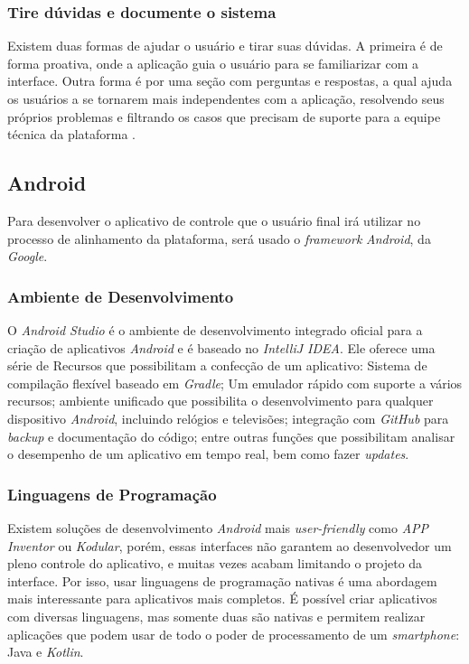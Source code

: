 \subsubsection{Tire dúvidas e documente o sistema}

Existem duas formas de ajudar o usuário e tirar suas dúvidas. A primeira é de forma proativa, onde a aplicação guia o usuário para se familiarizar com a interface. Outra forma é por uma seção com perguntas e respostas, a qual ajuda os usuários a se tornarem mais independentes com a aplicação, resolvendo seus próprios problemas e filtrando os casos que precisam de suporte para a equipe técnica da plataforma \cite{site:nielsenHelpandDoc}.

\subsection{Android}
Para desenvolver o aplicativo de controle que o usuário final irá utilizar no processo de alinhamento da plataforma, será usado o \textit{framework} \textit{Android}, da \textit{Google}.

\subsubsection{Ambiente de Desenvolvimento}

O \textit{Android Studio} é o ambiente de desenvolvimento integrado oficial para a criação de aplicativos \textit{Android} e é baseado no \textit{IntelliJ IDEA}. Ele oferece uma série de Recursos que possibilitam a confecção de um aplicativo: Sistema de compilação flexível baseado em \textit{Gradle}; Um emulador rápido com suporte a vários recursos; ambiente unificado que possibilita o desenvolvimento para qualquer dispositivo \textit{Android}, incluindo relógios e televisões; integração com \textit{GitHub} para \textit{backup} e documentação do código; entre outras funções que possibilitam analisar o desempenho de um aplicativo em tempo real, bem como fazer \textit{updates}. \cite{site:androidstudio}

\subsubsection{Linguagens de Programação}

Existem soluções de desenvolvimento \textit{Android} mais \textit{user-friendly} como \textit{APP Inventor} ou \textit{Kodular}, porém, essas interfaces não garantem ao desenvolvedor um pleno controle do aplicativo, e muitas vezes acabam limitando o projeto da interface. Por isso, usar linguagens de programação nativas é uma abordagem mais interessante para aplicativos mais completos. É possível criar aplicativos com diversas linguagens, mas somente duas são nativas e permitem realizar aplicações que podem usar de todo o poder de processamento de um \textit{smartphone}: Java e \textit{Kotlin}.

